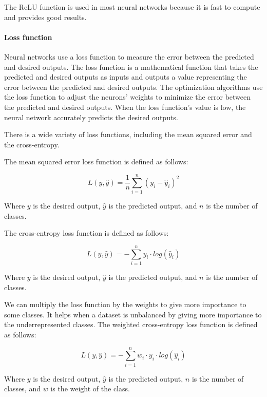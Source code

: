 The ReLU function is used in most neural networks because it is fast to compute and provides good results.

\paragraph{Loss function}

Neural networks use a loss function to measure the error between the predicted and desired outputs. The loss function is a mathematical function that takes the predicted and desired outputs as inputs and outputs a value representing the error between the predicted and desired outputs. The optimization algorithms use the loss function to adjust the neurons' weights to minimize the error between the predicted and desired outputs. When the loss function's value is low, the neural network accurately predicts the desired outputs.


There is a wide variety of loss functions, including the mean squared error and the cross-entropy.

The mean squared error loss function is defined as follows:

\begin{equation}
    L(y, \hat{y}) = \frac{1}{n} \sum_{i=1}^{n} (y_{i} - \hat{y}_{i})^2
\end{equation}

Where $y$ is the desired output, $\hat{y}$ is the predicted output, and $n$ is the number of classes.

The cross-entropy loss function is defined as follows:

\begin{equation}
    L(y, \hat{y}) = - \sum_{i=1}^{n} y_{i} \cdot log(\hat{y}_{i})
\end{equation}

Where $y$ is the desired output, $\hat{y}$ is the predicted output, and $n$ is the number of classes.

We can multiply the loss function by the weights to give more importance to some classes. It helps when a dataset is unbalanced by giving more importance to the underrepresented classes. The weighted cross-entropy loss function is defined as follows:

\begin{equation}
    L(y, \hat{y}) = - \sum_{i=1}^{n} w_{i} \cdot y_{i} \cdot log(\hat{y}_{i})
\end{equation}

Where $y$ is the desired output, $\hat{y}$ is the predicted output, $n$ is the number of classes, and $w$ is the weight of the class.

